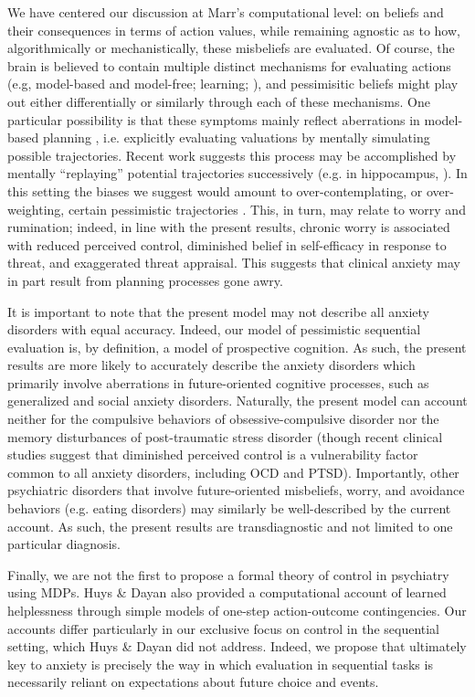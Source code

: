 \documentclass[11pt]{article} %
\begin{document}
We have centered our discussion at Marr's \cite{marr1982} computational level: on beliefs and their consequences in terms of action values, while remaining agnostic as to how, algorithmically or mechanistically, these misbeliefs are evaluated. Of course, the brain is believed to contain multiple distinct mechanisms for evaluating actions (e.g, model-based and model-free; learning; \cite{daw2005, huys2015}), and pessimisitic beliefs might play out either differentially or similarly through each of these mechanisms. One particular possibility is that these symptoms mainly reflect aberrations in model-based planning \cite{huys2015}, i.e. explicitly evaluating valuations by mentally simulating possible trajectories. Recent work suggests this process may be accomplished by mentally ``replaying'' potential trajectories successively (e.g. in hippocampus, \cite{mattar2018}). In this setting the biases we suggest would amount to over-contemplating, or over-weighting, certain pessimistic trajectories \cite{hunter2019}. This, in turn, may relate to worry and rumination; indeed, in line with the present results, chronic worry is associated with reduced perceived control, diminished belief in self-efficacy in response to threat, and exaggerated threat appraisal\cite{Berenbaum2010}. This suggests that clinical anxiety may in part result from planning processes gone awry. 

It is important to note that the present model may not describe all anxiety disorders with equal accuracy. Indeed, our model of pessimistic sequential evaluation is, by definition, a model of prospective cognition. As such, the present results are more likely to accurately describe the anxiety disorders which primarily involve aberrations in future-oriented cognitive processes, such as generalized and social anxiety disorders. Naturally, the present model can account neither for the compulsive behaviors of obsessive-compulsive disorder nor the memory disturbances of post-traumatic stress disorder (though recent clinical studies suggest that diminished perceived control is a vulnerability factor common to all anxiety disorders, including OCD and PTSD)\citep{gallagher2014a, gallagher2014b}. Importantly, other psychiatric disorders that involve future-oriented misbeliefs, worry, and avoidance behaviors (e.g. eating disorders\citep{konstantellou2011}) may similarly be well-described by the current account. As such, the present results are transdiagnostic and not limited to one particular diagnosis. 

Finally, we are not the first to propose a formal theory of control in psychiatry using MDPs. Huys \& Dayan \cite{HuysDayan2009} also provided a computational account of learned helplessness through simple models of one-step action-outcome contingencies. Our accounts differ particularly in our exclusive focus on control in the sequential setting, which Huys \& Dayan did not address. Indeed, we propose that ultimately key to anxiety is precisely the way in which evaluation in sequential tasks is necessarily reliant on expectations about future choice and events.
\end{document}
